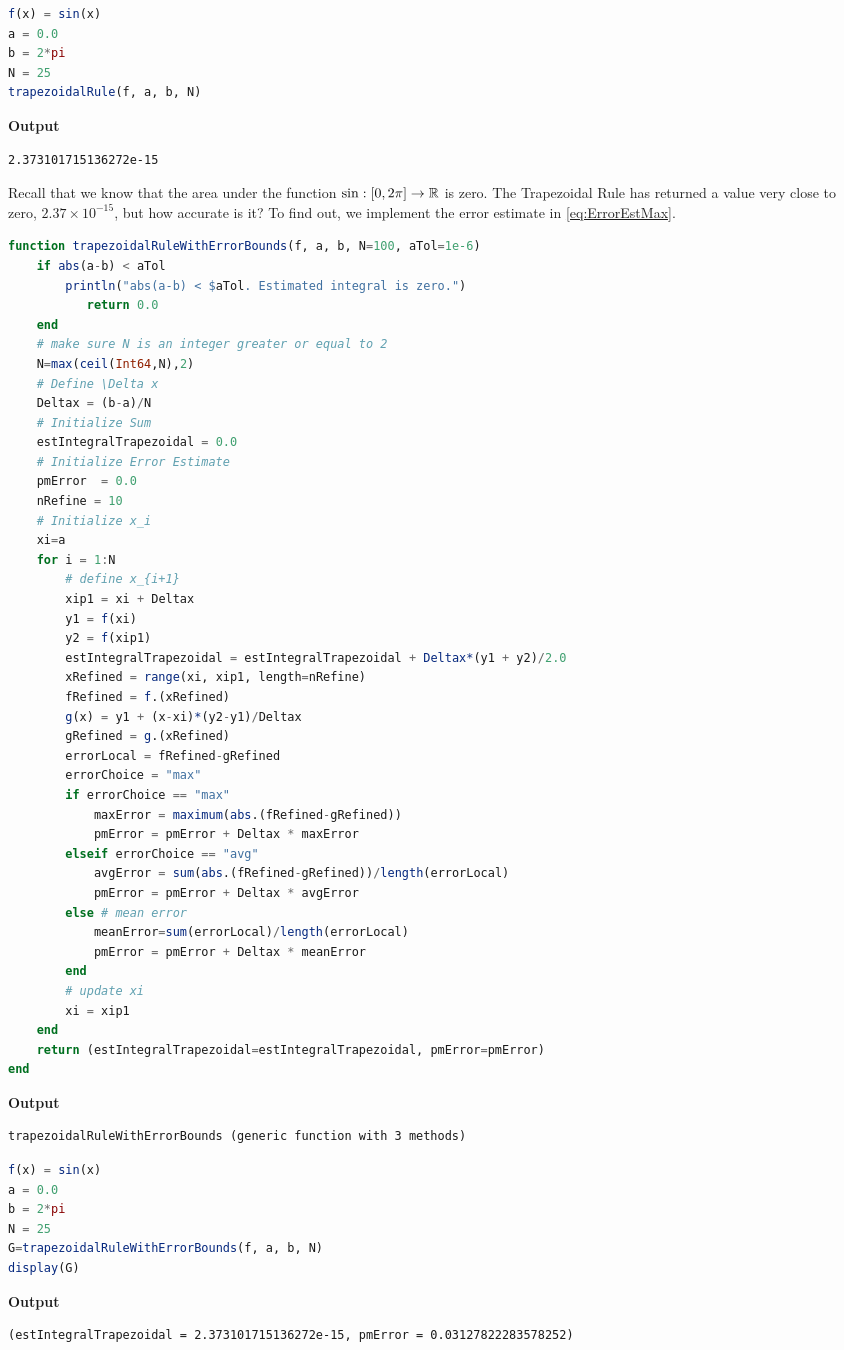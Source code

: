 \bigskip

\begin{lstlisting}[language=Julia,style=mystyle]
f(x) = sin(x)
a = 0.0
b = 2*pi
N = 25
trapezoidalRule(f, a, b, N)
\end{lstlisting}
\textbf{Output} 
\begin{verbatim}
2.373101715136272e-15
\end{verbatim}

Recall that we know that the area under the function $\sin:[0, 2 \pi] \to \mathbb R$ is zero. The Trapezoidal Rule has returned a value very close to zero, $2.37\times 10^{-15}$, but how accurate is it? To find out, we implement the error estimate in \eqref{eq:ErrorEstMax}. 

\bigskip
\begin{lstlisting}[language=Julia,style=mystyle]
function trapezoidalRuleWithErrorBounds(f, a, b, N=100, aTol=1e-6)
    if abs(a-b) < aTol 
        println("abs(a-b) < $aTol. Estimated integral is zero.")
           return 0.0
    end
    # make sure N is an integer greater or equal to 2
    N=max(ceil(Int64,N),2)
    # Define \Delta x
    Deltax = (b-a)/N
    # Initialize Sum
    estIntegralTrapezoidal = 0.0
    # Initialize Error Estimate
    pmError  = 0.0
    nRefine = 10
    # Initialize x_i
    xi=a
    for i = 1:N
        # define x_{i+1}
        xip1 = xi + Deltax
        y1 = f(xi)
        y2 = f(xip1)
        estIntegralTrapezoidal = estIntegralTrapezoidal + Deltax*(y1 + y2)/2.0
        xRefined = range(xi, xip1, length=nRefine)
        fRefined = f.(xRefined)
        g(x) = y1 + (x-xi)*(y2-y1)/Deltax 
        gRefined = g.(xRefined)
        errorLocal = fRefined-gRefined
        errorChoice = "max"
        if errorChoice == "max"
            maxError = maximum(abs.(fRefined-gRefined))
            pmError = pmError + Deltax * maxError
        elseif errorChoice == "avg"
            avgError = sum(abs.(fRefined-gRefined))/length(errorLocal)
            pmError = pmError + Deltax * avgError
        else # mean error
            meanError=sum(errorLocal)/length(errorLocal)
            pmError = pmError + Deltax * meanError
        end
        # update xi
        xi = xip1
    end
    return (estIntegralTrapezoidal=estIntegralTrapezoidal, pmError=pmError)
end
\end{lstlisting}
\textbf{Output} 
\begin{verbatim}
trapezoidalRuleWithErrorBounds (generic function with 3 methods)
\end{verbatim}

\begin{lstlisting}[language=Julia,style=mystyle]
f(x) = sin(x)
a = 0.0
b = 2*pi
N = 25
G=trapezoidalRuleWithErrorBounds(f, a, b, N)
display(G)
\end{lstlisting}
\textbf{Output} 
\begin{verbatim}
(estIntegralTrapezoidal = 2.373101715136272e-15, pmError = 0.03127822283578252)
\end{verbatim}

